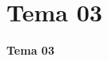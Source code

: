 



\section[Tema 03]{Tema 03}\label{sec:tema03}



{
  \begin{frame}[plain]%

    \vfill

    \centering{}
    \Huge{\textbf{Tema 03}}

    \vfill

  \end{frame}
} %



